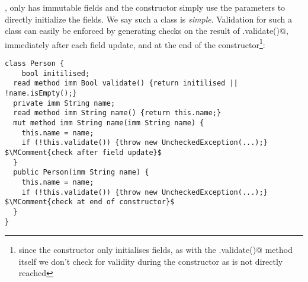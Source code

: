 \Q@Person@, only has immutable fields and the constructor simply use the parameters to directly initialize  the fields. We say such a class is \emph{simple}. Validation for such a class can easily be enforced by generating checks on the result of \Q@.validate()@, immediately after each field update, and at the end of the constructor\footnote{since the constructor only initialises fields, as with the \Q@.validate()@ method itself we don't check for validity during the constructor as \Q@this@ is not directly reached}:
\begin{lstlisting}
class Person {
	bool initilised;
  read method imm Bool validate() {return initilised || !name.isEmpty();}
  private imm String name;
  read method imm String name() {return this.name;}
  mut method imm String name(imm String name) {
    this.name = name;
    if (!this.validate()) {throw new UncheckedException(...);} $\MComment{check after field update}$
  }
  public Person(imm String name) {
    this.name = name;
    if (!this.validate()) {throw new UncheckedException(...);} $\MComment{check at end of constructor}$
  }
}
\end{lstlisting}


